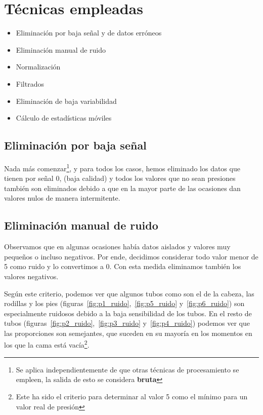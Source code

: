 \documentclass[a4paper,12pt,twoside,oldfontcommands]{memoir}
\begin{document}
\section{Técnicas empleadas}
\begin{itemize}
\item Eliminación por baja señal y de datos erróneos
\item Eliminación manual de ruido
\item Normalización
\item Filtrados
\item Eliminación de baja variabilidad
\item Cálculo de estadísticas móviles 
\end{itemize}
\subsection{Eliminación por baja señal}
Nada más comenzar\footnote{Se aplica independientemente de que otras técnicas de procesamiento se empleen, la salida de esto se considera \textbf{bruta}}, y para todos los casos, hemos eliminado los datos que tienen por señal 0, (baja calidad) y todos los valores que no sean presiones también son eliminados debido a que en la mayor parte de las ocasiones dan valores nulos de manera intermitente.

\subsection{Eliminación manual de ruido}
Observamos que en algunas ocasiones había datos aislados y valores muy pequeños o incluso negativos. Por ende, decidimos considerar todo valor menor de 5 como ruido y lo convertimos a 0. Con esta medida eliminamos también los valores negativos.

Según este criterio, podemos ver que algunos tubos como son el de la cabeza, las rodillas y los pies (figuras~\ref{fig:p1_ruido},~\ref{fig:p5_ruido} y~\ref{fig:p6_ruido}) son especialmente ruidosos debido a la baja sensibilidad de los tubos. En el resto de tubos (figuras~\ref{fig:p2_ruido},~\ref{fig:p3_ruido} y~\ref{fig:p4_ruido}) podemos ver que las proporciones son semejantes, que suceden en su mayoría en los momentos en los que la cama está vacía\footnote{Este ha sido el criterio para determinar al valor 5 como el mínimo para un valor real de presión}.
\end{document}
